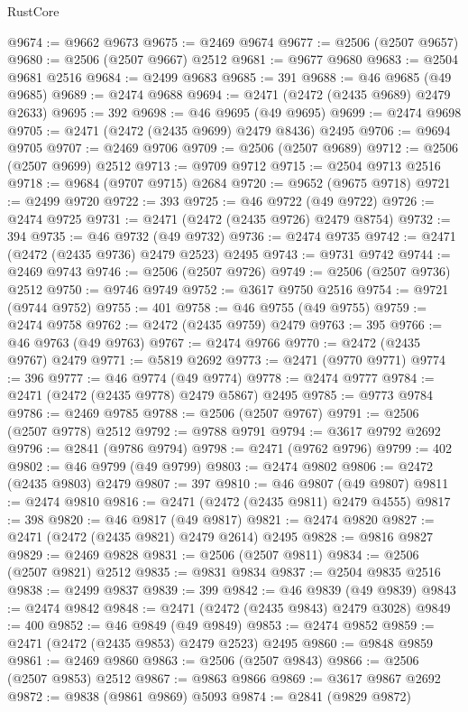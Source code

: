 \begin{lexlean}{RustCore}
\begin{coremodule}
@9674 := @9662 @9673
@9675 := @2469 @9674
@9677 := @2506 (@2507 @9657)
@9680 := @2506 (@2507 @9667) @2512
@9681 := @9677 @9680
@9683 := @2504 @9681 @2516
@9684 := @2499 @9683
@9685 := 391
@9688 := @46 @9685 (@49 @9685)
@9689 := @2474 @9688
@9694 := @2471 (@2472 (@2435 @9689) @2479 @2633)
@9695 := 392
@9698 := @46 @9695 (@49 @9695)
@9699 := @2474 @9698
@9705 := @2471 (@2472 (@2435 @9699) @2479 @8436) @2495
@9706 := @9694 @9705
@9707 := @2469 @9706
@9709 := @2506 (@2507 @9689)
@9712 := @2506 (@2507 @9699) @2512
@9713 := @9709 @9712
@9715 := @2504 @9713 @2516
@9718 := @9684 (@9707 @9715) @2684
@9720 := @9652 (@9675 @9718)
@9721 := @2499 @9720
@9722 := 393
@9725 := @46 @9722 (@49 @9722)
@9726 := @2474 @9725
@9731 := @2471 (@2472 (@2435 @9726) @2479 @8754)
@9732 := 394
@9735 := @46 @9732 (@49 @9732)
@9736 := @2474 @9735
@9742 := @2471 (@2472 (@2435 @9736) @2479 @2523) @2495
@9743 := @9731 @9742
@9744 := @2469 @9743
@9746 := @2506 (@2507 @9726)
@9749 := @2506 (@2507 @9736) @2512
@9750 := @9746 @9749
@9752 := @3617 @9750 @2516
@9754 := @9721 (@9744 @9752)
@9755 := 401
@9758 := @46 @9755 (@49 @9755)
@9759 := @2474 @9758
@9762 := @2472 (@2435 @9759) @2479
@9763 := 395
@9766 := @46 @9763 (@49 @9763)
@9767 := @2474 @9766
@9770 := @2472 (@2435 @9767) @2479
@9771 := @5819 @2692
@9773 := @2471 (@9770 @9771)
@9774 := 396
@9777 := @46 @9774 (@49 @9774)
@9778 := @2474 @9777
@9784 := @2471 (@2472 (@2435 @9778) @2479 @5867) @2495
@9785 := @9773 @9784
@9786 := @2469 @9785
@9788 := @2506 (@2507 @9767)
@9791 := @2506 (@2507 @9778) @2512
@9792 := @9788 @9791
@9794 := @3617 @9792 @2692
@9796 := @2841 (@9786 @9794)
@9798 := @2471 (@9762 @9796)
@9799 := 402
@9802 := @46 @9799 (@49 @9799)
@9803 := @2474 @9802
@9806 := @2472 (@2435 @9803) @2479
@9807 := 397
@9810 := @46 @9807 (@49 @9807)
@9811 := @2474 @9810
@9816 := @2471 (@2472 (@2435 @9811) @2479 @4555)
@9817 := 398
@9820 := @46 @9817 (@49 @9817)
@9821 := @2474 @9820
@9827 := @2471 (@2472 (@2435 @9821) @2479 @2614) @2495
@9828 := @9816 @9827
@9829 := @2469 @9828
@9831 := @2506 (@2507 @9811)
@9834 := @2506 (@2507 @9821) @2512
@9835 := @9831 @9834
@9837 := @2504 @9835 @2516
@9838 := @2499 @9837
@9839 := 399
@9842 := @46 @9839 (@49 @9839)
@9843 := @2474 @9842
@9848 := @2471 (@2472 (@2435 @9843) @2479 @3028)
@9849 := 400
@9852 := @46 @9849 (@49 @9849)
@9853 := @2474 @9852
@9859 := @2471 (@2472 (@2435 @9853) @2479 @2523) @2495
@9860 := @9848 @9859
@9861 := @2469 @9860
@9863 := @2506 (@2507 @9843)
@9866 := @2506 (@2507 @9853) @2512
@9867 := @9863 @9866
@9869 := @3617 @9867 @2692
@9872 := @9838 (@9861 @9869) @5093
@9874 := @2841 (@9829 @9872)

\end{coremodule}
\end{lexlean}
